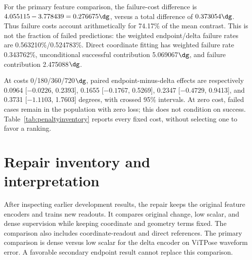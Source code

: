 \begin{table}[h]\centering\small
\caption{Response reliability for all variants. Fail is a person-balanced percentage. Success is $U$, Cost is $720f$, Total is their sum, and Conditional is $U/(1-f)$, all in degrees. Raw failed-pair counts across seeds differ from these weighted rates and are not used in their place.}
\label{tab:failureinventory}
\setlength{\tabcolsep}{3.8pt}
\end{table}

For the primary feature comparison, the failure-cost difference is $4.055115-3.778439=0.276675\dg$, versus a total difference of $0.373054\dg$. Thus failure costs account arithmetically for 74.17\% of the mean contrast. This is not the fraction of failed predictions: the weighted endpoint/delta failure rates are 0.563210\%/0.524783\%. Direct coordinate fitting has weighted failure rate 0.343762\%, unconditional successful contribution 5.069067$\dg$, and failure contribution 2.475088$\dg$.

At costs 0/180/360/720$\dg$, paired endpoint-minus-delta effects are respectively 0.0964 [$-0.0226$, 0.2393], 0.1655 [$-0.1767$, 0.5269], 0.2347 [$-0.4729$, 0.9413], and 0.3731 [$-1.1103$, 1.7603] degrees, with crossed 95\% intervals. At zero cost, failed cases remain in the population with zero loss; this does not condition on success. Table~\ref{tab:penaltyinventory} reports every fixed cost, without selecting one to favor a ranking.

\begin{table}[h]\centering\small
\caption{All rescored response means ($\dg$) with unchanged predictions and failure indicators. Costs 180 and 360 are quarter/half-cost stress tests; zero is an accounting lower bound; 720 is the original maximum valid-response-error bound. All new sensitivities are exploratory.}
\label{tab:penaltyinventory}
\setlength{\tabcolsep}{5pt}
\end{table}

\clearpage
\section{Repair inventory and interpretation}
\label{app:repair}
After inspecting earlier development results, the repair keeps the original feature encoders and trains new readouts. It compares original change, low scalar, and dense supervision while keeping coordinate and geometry terms fixed. The comparison also includes coordinate-readout and direct references. The primary comparison is dense versus low scalar for the delta encoder on ViTPose waveform error. A favorable secondary endpoint result cannot replace this comparison.

